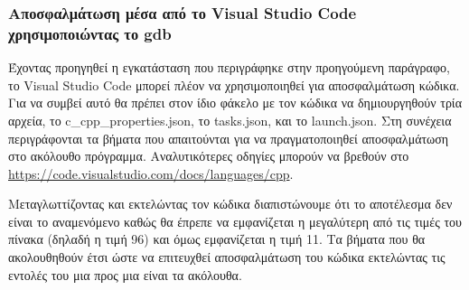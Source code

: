 \subsubsection*{Αποσφαλμάτωση μέσα από το Visual Studio Code χρησιμοποιώντας το gdb}
Έχοντας προηγηθεί η εγκατάσταση που περιγράφηκε στην προηγούμενη παράγραφο, το Visual Studio Code μπορεί πλέον να χρησιμοποιηθεί για αποσφαλμάτωση κώδικα. Για να συμβεί αυτό θα πρέπει στον ίδιο φάκελο με τον κώδικα να δημιουργηθούν τρία αρχεία, το c\_cpp\_properties.json, το tasks.json, και το launch.json. Στη συνέχεια περιγράφονται τα βήματα που απαιτούνται για να πραγματοποιηθεί αποσφαλμάτωση στο ακόλουθο πρόγραμμα. Αναλυτικότερες οδηγίες μπορούν να βρεθούν στο \href{https://code.visualstudio.com/docs/languages/cpp}{https://code.visualstudio.com/docs/languages/cpp}. 



Μεταγλωττίζοντας και εκτελώντας τον κώδικα διαπιστώνουμε ότι το αποτέλεσμα δεν είναι το αναμενόμενο καθώς θα έπρεπε να εμφανίζεται η μεγαλύτερη από τις τιμές του πίνακα (δηλαδή η τιμή 96) και όμως εμφανίζεται η τιμή 11. Τα βήματα που θα ακολουθηθούν έτσι ώστε να επιτευχθεί αποσφαλμάτωση του κώδικα εκτελώντας τις εντολές του μια προς μια είναι τα ακόλουθα.

